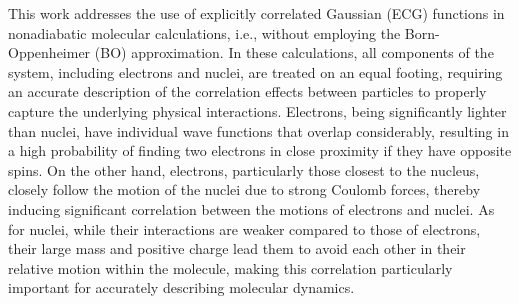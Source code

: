 \documentclass[%
 reprint,
 amsmath,amssymb,
 aps,
]{revtex4-2}
\begin{document}
This work addresses the use of explicitly correlated Gaussian (ECG) functions in nonadiabatic molecular calculations, i.e., without employing the Born-Oppenheimer (BO) approximation. In these calculations, all components of the system, including electrons and nuclei, are treated on an equal footing, requiring an accurate description of the correlation effects between particles to properly capture the underlying physical interactions. Electrons, being significantly lighter than nuclei, have individual wave functions that overlap considerably, resulting in a high probability of finding two electrons in close proximity if they have opposite spins. On the other hand, electrons, particularly those closest to the nucleus, closely follow the motion of the nuclei due to strong Coulomb forces, thereby inducing significant correlation between the motions of electrons and nuclei. As for nuclei, while their interactions are weaker compared to those of electrons, their large mass and positive charge lead them to avoid each other in their relative motion within the molecule, making this correlation particularly important for accurately describing molecular dynamics.
\end{document}
